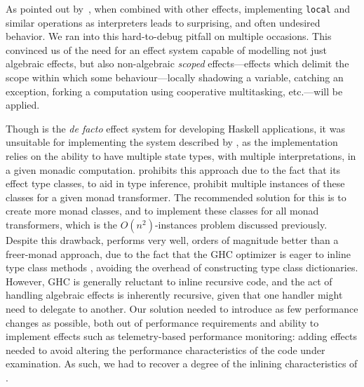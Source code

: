 \documentclass[acmsmall,fleqn]{acmart}
\begin{document}
As pointed out by~\citet{wu2014effect}, when combined with other effects,
implementing \texttt{local} and similar operations as interpreters leads to
surprising, and often undesired behavior. We ran into this hard-to-debug pitfall
on multiple occasions.
%
%
This
convinced us of the need for
an effect system capable of modelling not just algebraic effects, but also
non-algebraic \emph{scoped} effects—effects which delimit the scope within which
some behaviour---locally shadowing a variable, catching an exception, forking a
computation using cooperative multitasking, etc.---will be applied.

Though \mtl{} is the \emph{de facto} effect system for developing Haskell
applications, it was unsuitable for implementing the system described by
\citet{Darais17Abstracting}, as the implementation relies on the ability to have
multiple state types, with multiple interpretations, in a given monadic
computation. \mtl{} prohibits this approach due to the fact that its effect type
classes, to aid in type inference, prohibit multiple instances of these classes
for a given monad transformer. The recommended solution for this is to create
more monad classes, and to implement these classes for all monad transformers,
which is the $O(n^2)$-instances problem discussed previously. Despite this
drawback, \mtl{} performs very well, orders of magnitude better than a
freer-monad approach, due to the fact that the GHC optimizer is eager to inline
type class methods \cite{PeytonJones02Secrets}, avoiding the overhead of
constructing type class dictionaries. However, GHC is generally reluctant to
inline recursive code, and the act of handling algebraic effects is inherently
recursive, given that one handler might need to delegate to another. Our
solution needed to introduce as few performance changes as possible, both out of
performance requirements and ability to implement effects such as
telemetry-based performance monitoring: adding effects needed to avoid altering
the performance characteristics of the code under examination. As such,
we had to recover a degree of the inlining characteristics of \mtl{}.
\end{document}
